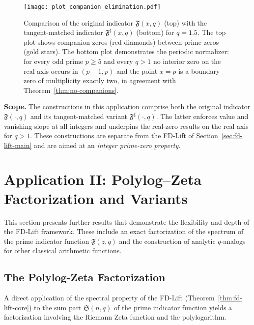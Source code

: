 \documentclass[11pt,a4paper]{amsart}
\newcommand{\Fbase}{\mathfrak F}
\newcommand{\Fsharp}{\Fbase^{\sharp}}
\theoremstyle{plain}
\theoremstyle{definition}
\theoremstyle{remark}
\begin{document}
\begin{figure}[!htbp]
\centering
\texttt{[image: plot\_companion\_elimination.pdf]}
\caption{Comparison of the original indicator $\mathfrak{F}(x,q)$ (top) with the tangent-matched indicator $\Fsharp(x,q)$ (bottom) for $q=1.5$. The top plot shows companion zeros (red diamonds) between prime zeros (gold stars). The bottom plot demonstrates the periodic normalizer: for every odd prime $p\ge5$ and every $q>1$ no interior zero on the real axis occurs in $(p-1,p)$ and the point $x=p$ is a boundary zero of multiplicity exactly two, in agreement with Theorem~\ref{thm:no-companions}.}
\label{fig:companion_elimination}
\end{figure}

\FloatBarrier


\noindent\textbf{Scope.} The constructions in this application comprise both the original indicator $\mathfrak F(\cdot,q)$ and its tangent-matched variant $\Fsharp(\cdot,q)$. The latter enforces value and vanishing slope at all integers and underpins the real-zero results on the real axis for $q>1$. These constructions are separate from the FD-Lift of Section~\ref{sec:fd-lift-main} and are aimed at an \emph{integer prime-zero property}.

\section{Application II: Polylog–Zeta Factorization and Variants}\label{sec:application-key-results}

This section presents further results that demonstrate the flexibility and depth of the FD-Lift framework. These include an exact factorization of the spectrum of the prime indicator function $\mathfrak{F}(z,q)$ and the construction of analytic $q$-analogs for other classical arithmetic functions.

\subsection{The Polylog-Zeta Factorization}

A direct application of the spectral property of the FD-Lift (Theorem~\ref{thm:fd-lift-core}) to the sum part $\mathfrak{S}(n,q)$ of the prime indicator function yields a factorization involving the Riemann Zeta function and the polylogarithm.
\end{document}
